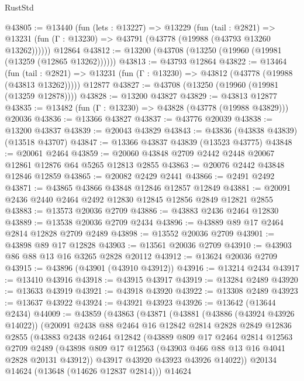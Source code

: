 \begin{lexlean}{RustStd}
\begin{coremodule}
@43805 := @13440
    (fun (lets : @13227) =>
    @13229
      (fun (tail : @2821) =>
      @13231 (fun (Γ : @13230) => @43791 (@43778 (@19988 (@43793 @13260 @13262))))))
    @12864
@43812 := @13200 (@43708 (@13250 (@19960 (@19981 (@13259 (@12865 @13262))))))
@43813 := @43793 @12864
@43822 := @13464
    (fun (tail : @2821) => @13231 (fun (Γ : @13230) => @43812 (@43778 (@19988 (@43813 @13262)))))
    @12877
@43827 := @43708 (@13250 (@19960 (@19981 (@13259 @12878))))
@43828 := @13200 @43827
@43829 := @43813 @12877
@43835 := @13482 (fun (Γ : @13230) => @43828 (@43778 (@19988 @43829))) @20036
@43836 := @13366 @43827
@43837 := @43776 @20039
@43838 := @13200 @43837
@43839 := @20043 @43829
@43843 := @43836 (@43838 @43839) (@13518 @43707)
@43847 := @13366 @43837 @43839 (@13523 @43775)
@43848 := @20061 @2464
@43859 := @20060 @43848 @2709 @2442 @2448 @20067 @12861 @12876 @64 @5265 @12813 @2855
@43863 := @20076 @2442 @43848 @12846 @12859
@43865 := @20082 @2429 @2441
@43866 := @2491 @2492
@43871 := @43865 @43866 @43848 @12846 @12857 @12849
@43881 := @20091 @2436 @2440 @2464 @2492 @12830 @12845 @12856 @2849 @12821 @2855
@43883 := @13573 @20036 @2709
@43886 := @43883 @2436 @2464 @12830
@43889 := @13538 @20036 @2709 @2434
@43896 := @43889 @89 @17 @2464 @2814 @12828 @2709 @2489
@43898 := @13552 @20036 @2709
@43901 := @43898 @89 @17 @12828
@43903 := @13561 @20036 @2709
@43910 := @43903 @86 @88 @13 @16 @3265 @2828 @20112
@43912 := @13624 @20036 @2709
@43915 := @43896 (@43901 (@43910 @43912))
@43916 := @13214 @2434
@43917 := @13410 @43916
@43918 := @43915 @43917
@43919 := @13284 @2489
@43920 := @13633 @43919
@43921 := @43918 @43920
@43922 := @13308 @2489
@43923 := @13637 @43922
@43924 := @43921 @43923
@43926 := @13642 (@13644 @2434)
@44009 := @43859
    (@43863
      (@43871
        (@43881
          (@43886 (@43924 @43926 @14022))
          (@20091
            @2438
            @88
            @2464
            @16
            @12842
            @2814
            @2828
            @2849
            @12836
            @2855
            (@43883
              @2438
              @2464
              @12842
              (@43889
                @809
                @17
                @2464
                @2814
                @12563
                @2709
                @2489
                (@43898 @809 @17 @12563 (@43903 @466 @88 @13 @16 @4041 @2828 @20131 @43912))
                @43917
                @43920
                @43923
                @43926
                @14022))
            @20134
            @14624
            (@13648 (@14626 @12837 @2814)))
          @14624

\end{coremodule}
\end{lexlean}
